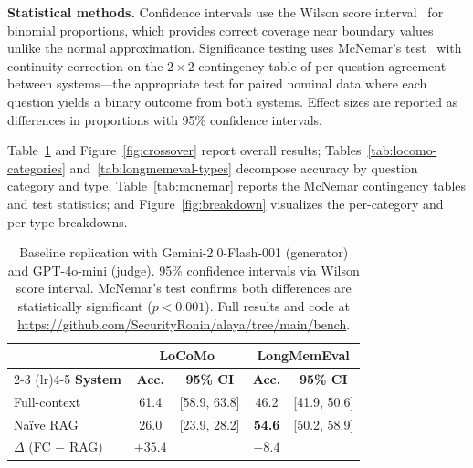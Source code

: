 \smallskip
\noindent\textbf{Statistical methods.}\enspace
Confidence intervals use the Wilson score interval~\cite{wilson1927} for
binomial proportions, which provides correct coverage near boundary values
unlike the normal approximation.  Significance testing uses McNemar's
test~\cite{mcnemar1947} with continuity correction on the $2 \times 2$
contingency table of per-question agreement between systems---the appropriate
test for paired nominal data where each question yields a binary outcome from
both systems.  Effect sizes are reported as differences in proportions with
95\% confidence intervals.

Table~\ref{tab:our-baselines} and Figure~\ref{fig:crossover} report overall
results; Tables~\ref{tab:locomo-categories} and~\ref{tab:longmemeval-types}
decompose accuracy by question category and type;
Table~\ref{tab:mcnemar} reports the McNemar contingency tables and test
statistics; and Figure~\ref{fig:breakdown} visualizes the per-category and
per-type breakdowns.

\begin{table}[!t]
\centering
\caption{Baseline replication with Gemini-2.0-Flash-001 (generator) and
GPT-4o-mini (judge).  95\% confidence intervals via Wilson score interval.
McNemar's test confirms both differences are statistically significant
($p < 0.001$).  Full results and code at
\url{https://github.com/SecurityRonin/alaya/tree/main/bench}.}
\label{tab:our-baselines}
\small
\begin{tabular}{@{}lcccc@{}}
\toprule
& \multicolumn{2}{c}{\textbf{LoCoMo}} & \multicolumn{2}{c}{\textbf{LongMemEval}} \\
\cmidrule(lr){2-3} \cmidrule(lr){4-5}
\textbf{System} & \textbf{Acc.} & \textbf{95\% CI} & \textbf{Acc.} & \textbf{95\% CI} \\
\midrule
Full-context & 61.4 & [58.9, 63.8] & 46.2 & [41.9, 50.6] \\
Na\"ive RAG  & 26.0 & [23.9, 28.2] & \textbf{54.6} & [50.2, 58.9] \\
\midrule
$\Delta$ (FC $-$ RAG) & $+35.4$ & & $-8.4$ & \\
\bottomrule
\end{tabular}
\end{table}

